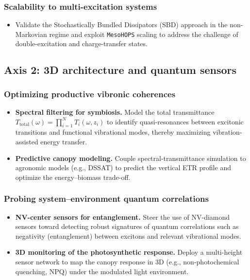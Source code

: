 \documentclass[12pt, a4paper]{article}
\begin{document}
\subsubsection{Scalability to multi-excitation systems}
\begin{itemize}
\item Validate the Stochastically Bundled Dissipators (SBD) approach in the non-Markovian regime and exploit \texttt{MesoHOPS} scaling to address the challenge of double-excitation and charge-transfer states.
\end{itemize}

\subsection{Axis 2: 3D architecture and quantum sensors}

\subsubsection{Optimizing productive vibronic coherences}
\begin{itemize}
    \item \textbf{Spectral filtering for symbiosis.} Model the total transmittance $T_{\text{total}}(\omega) = \prod_{i=1}^N T_i(\omega, z_i)$ to identify quasi-resonances between excitonic transitions and functional vibrational modes, thereby maximizing vibration-assisted energy transfer.

    \item \textbf{Predictive canopy modeling.} Couple spectral-transmittance simulation to agronomic models (e.g., DSSAT) to predict the vertical ETR profile and optimize the energy–biomass trade-off.
\end{itemize}

\subsubsection{Probing system–environment quantum correlations}
\begin{itemize}
    \item \textbf{NV-center sensors for entanglement.} Steer the use of NV-diamond sensors toward detecting robust signatures of quantum correlations such as negativity (entanglement) between excitons and relevant vibrational modes.

    \item \textbf{3D monitoring of the photosynthetic response.} Deploy a multi-height sensor network to map the canopy response in 3D (e.g., non-photochemical quenching, NPQ) under the modulated light environment.
\end{itemize}
\end{document}
